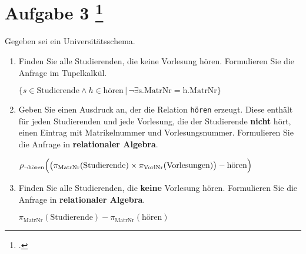 \documentclass{lehramt-informatik-aufgabe}
\begin{document}
\section{Aufgabe 3
\footcite{examen:66116:2020:03}}

Gegeben sei ein Universitätsschema.

\begin{enumerate}


\item Finden Sie alle Studierenden, die keine Vorlesung hören.
Formulieren Sie die Anfrage im Tupelkalkül.

\begin{liAntwort}
$\{ s \in \text{Studierende} \land h \in \text{hören} \, | \, \neg \exists \text{s.MatrNr} = \text{h.MatrNr} \}$
\end{liAntwort}


\item Geben Sie einen Ausdruck an, der die Relation \neg \texttt{hören}
erzeugt. Diese enthält für jeden Studierenden und jede Vorlesung, die
der Studierende \textbf{nicht} hört, einen Eintrag mit Matrikelnummer
und Vorlesungsnummer. Formulieren Sie die Anfrage in
\textbf{relationaler Algebra}.

\begin{liAntwort}
$\rho_{\neg \text{hören}} \Bigl(
\bigl(
  \pi_{\text{MatrNr}}(\text{Studierende})
  \times
  \pi_{\text{VorlNr}}(\text{Vorlesungen})
\bigr) - \text{hören}
\Bigr)
$
\end{liAntwort}


\item Finden Sie alle Studierenden, die \textbf{keine} Vorlesung hören.
Formulieren Sie die Anfrage in \textbf{relationaler Algebra}.

\begin{liAntwort}
$\pi_{\text{MatrNr}}(\text{Studierende}) - \pi_{\text{MatrNr}}(\text{hören})$
\end{liAntwort}
\end{enumerate}
\end{document}

